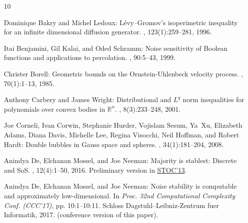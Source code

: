 \documentclass[11pt]{article}
\numberwithin{equation}{section}
\theoremstyle{definition}
\theoremstyle{plain}
\begin{document}
\tocrefpdfbookmark
\begin{thebibliography}{10}

{\sc Dominique Bakry and Michel Ledoux}: L{\'e}vy--{G}romov's isoperimetric
  inequality for an infinite dimensional diffusion generator.
, 123(1):259--281, 1996.
\newblock [\epfmtdoi{10.1007/BF01232376}]

{\sc Itai Benjamini, Gil Kalai, and Oded Schramm}: Noise sensitivity of
  {B}oolean functions and applications to percolation.
, 90:5--43, 1999.

{\sc Christer Borell}: Geometric bounds on the {O}rnstein-{U}hlenbeck velocity
  process.
,
  70(1):1--13, 1985.
\newblock [\epfmtdoi{10.1007/BF00532234}]

{\sc Anthony Carbery and James Wright}: {Distributional and $L^q$ norm
  inequalities for polynomials over convex bodies in ${\mathbb R}^n$}.
, 8(3):233--248, 2001.

{\sc Joe Corneli, Ivan Corwin, Stephanie Hurder, Vojislam Sesum, Ya~Xu,
  Elizabeth Adams, Diana Davis, Michelle Lee, Regina Visocchi, Neil Hoffman,
  and Robert Hardt}: Double bubbles in {G}auss space and spheres.
, 34(1):181--204, 2008.

{\sc Anindya De, Elchanan Mossel, and Joe Neeman}: Majority is stablest:
  {D}iscrete and {S}o{S}.
, 12(4):1--50, 2016.
\newblock Preliminary version in \href{https://doi.org/DOI:
  10.1145/2488608.2488668}{STOC'13}.

{\sc Anindya De, Elchanan Mossel, and Joe Neeman}: Noise stability is
  computable and approximately low-dimensional.
\newblock In {\em Proc. 32nd Computational Complexity Conf. (CCC'17)}, pp.
  10:1--10:11. Schloss Dagstuhl--Leibniz-Zentrum fuer Informatik, 2017.
\newblock (conference version of this paper).


\end{thebibliography}
\end{document}
